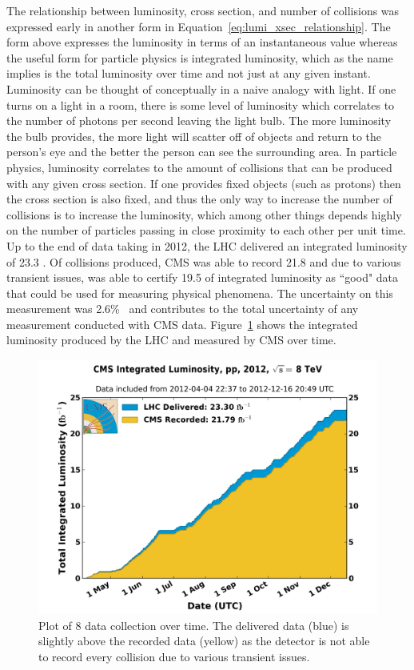 		The relationship between luminosity, cross section, and number of collisions was expressed early in another form in Equation~\ref{eq:lumi_xsec_relationship}. The form above expresses the luminosity in terms of an instantaneous value whereas the useful form for particle physics is integrated luminosity, which as the name implies is the total luminosity over time and not just at any given instant. Luminosity can be thought of conceptually in a naive analogy with light. If one turns on a light in a room, there is some level of luminosity which correlates to the number of photons per second leaving the light bulb. The more luminosity the bulb provides, the more light will scatter off of objects and return to the person's eye and the better the person can see the surrounding area. In particle physics, luminosity correlates to the amount of collisions that can be produced with any given cross section. If one provides fixed objects (such as protons) then the cross section is also fixed, and thus the only way to increase the number of collisions is to increase the luminosity, which among other things depends highly on the number of particles passing in close proximity to each other per unit time. \\
		
		Up to the end of data taking in 2012, the LHC delivered an integrated luminosity of 23.3 \fbinv. Of collisions produced, CMS was able to record 21.8 \fbinv and due to various transient issues, was able to certify 19.5 \fbinv of integrated luminosity as ``good" data that could be used for measuring physical phenomena. The uncertainty on this measurement was 2.6\%~\cite{lumi12up} and contributes to the total uncertainty of any measurement conducted with CMS data. Figure~\ref{fig:cms_int_lumi} shows the integrated luminosity produced by the LHC and measured by CMS over time.\\
\begin{figure}[h]
\begin{center}
\includegraphics[width=0.9\linewidth]{Figs/int_lumi_per_day_cumulative_pp_2012.png}
\end{center}
\caption{\label{fig:cms_int_lumi}
Plot of 8 \TeV data collection over time. The delivered data (blue) is slightly above the recorded data (yellow) as the detector is not able to record every collision due to various transient issues.
}
\end{figure}

